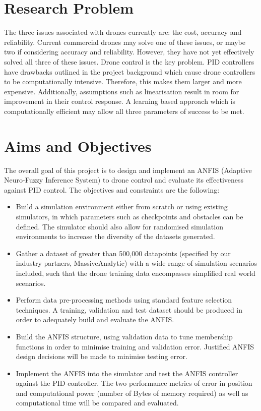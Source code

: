 \section{Research Problem}
The three issues associated with drones currently are: the cost, accuracy and reliability. Current commercial drones may solve one of these issues, or maybe two if considering accuracy and reliability. However, they have not yet effectively solved all three of these issues. Drone control is the key problem. PID controllers have drawbacks outlined in the project background which cause drone controllers to be computationally intensive. Therefore, this makes them larger and more expensive. Additionally, assumptions such as linearisation result in room for improvement in their control response. A learning based approach which is computationally efficient may allow all three parameters of success to be met. 
\section{Aims and Objectives}
The overall goal of this project is to design and implement an ANFIS (Adaptive Neuro-Fuzzy Inference System) to drone control and evaluate its effectiveness against PID control. The objectives and constraints are the following:

\begin{itemize}
  \item Build a simulation environment either from scratch or using existing simulators, in which parameters such as checkpoints and obstacles can be defined. The simulator should also allow for randomised simulation environments to increase the diversity of the datasets generated.
  \item Gather a dataset of greater than 500,000 datapoints (specified by our industry partners, MassiveAnalytic) with a wide range of simulation scenarios included, such that the drone training data encompasses simplified real world scenarios. 
  \item Perform data pre-processing methods using standard feature selection techniques. A training, validation and test dataset should be produced in order to adequately build and evaluate the ANFIS. 
  \item Build the ANFIS structure, using validation data to tune membership functions in order to minimise training and validation error. Justified ANFIS design decisions will be made to minimise testing error. 
  \item Implement the ANFIS into the simulator and test the ANFIS controller against the PID controller. The two performance metrics of error in position and computational power (number of Bytes of memory required) as well as computational time will be compared and evaluated.
  \end{itemize}

